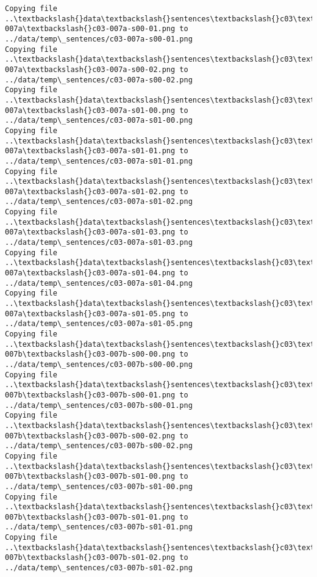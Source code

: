 \documentclass[11pt]{article}
\begin{document}
\begin{Verbatim}[commandchars=\\\{\}]
Copying file ..\textbackslash{}data\textbackslash{}sentences\textbackslash{}c03\textbackslash{}c03-007a\textbackslash{}c03-007a-s00-01.png to
../data/temp\_sentences/c03-007a-s00-01.png
Copying file ..\textbackslash{}data\textbackslash{}sentences\textbackslash{}c03\textbackslash{}c03-007a\textbackslash{}c03-007a-s00-02.png to
../data/temp\_sentences/c03-007a-s00-02.png
Copying file ..\textbackslash{}data\textbackslash{}sentences\textbackslash{}c03\textbackslash{}c03-007a\textbackslash{}c03-007a-s01-00.png to
../data/temp\_sentences/c03-007a-s01-00.png
Copying file ..\textbackslash{}data\textbackslash{}sentences\textbackslash{}c03\textbackslash{}c03-007a\textbackslash{}c03-007a-s01-01.png to
../data/temp\_sentences/c03-007a-s01-01.png
Copying file ..\textbackslash{}data\textbackslash{}sentences\textbackslash{}c03\textbackslash{}c03-007a\textbackslash{}c03-007a-s01-02.png to
../data/temp\_sentences/c03-007a-s01-02.png
Copying file ..\textbackslash{}data\textbackslash{}sentences\textbackslash{}c03\textbackslash{}c03-007a\textbackslash{}c03-007a-s01-03.png to
../data/temp\_sentences/c03-007a-s01-03.png
Copying file ..\textbackslash{}data\textbackslash{}sentences\textbackslash{}c03\textbackslash{}c03-007a\textbackslash{}c03-007a-s01-04.png to
../data/temp\_sentences/c03-007a-s01-04.png
Copying file ..\textbackslash{}data\textbackslash{}sentences\textbackslash{}c03\textbackslash{}c03-007a\textbackslash{}c03-007a-s01-05.png to
../data/temp\_sentences/c03-007a-s01-05.png
Copying file ..\textbackslash{}data\textbackslash{}sentences\textbackslash{}c03\textbackslash{}c03-007b\textbackslash{}c03-007b-s00-00.png to
../data/temp\_sentences/c03-007b-s00-00.png
Copying file ..\textbackslash{}data\textbackslash{}sentences\textbackslash{}c03\textbackslash{}c03-007b\textbackslash{}c03-007b-s00-01.png to
../data/temp\_sentences/c03-007b-s00-01.png
Copying file ..\textbackslash{}data\textbackslash{}sentences\textbackslash{}c03\textbackslash{}c03-007b\textbackslash{}c03-007b-s00-02.png to
../data/temp\_sentences/c03-007b-s00-02.png
Copying file ..\textbackslash{}data\textbackslash{}sentences\textbackslash{}c03\textbackslash{}c03-007b\textbackslash{}c03-007b-s01-00.png to
../data/temp\_sentences/c03-007b-s01-00.png
Copying file ..\textbackslash{}data\textbackslash{}sentences\textbackslash{}c03\textbackslash{}c03-007b\textbackslash{}c03-007b-s01-01.png to
../data/temp\_sentences/c03-007b-s01-01.png
Copying file ..\textbackslash{}data\textbackslash{}sentences\textbackslash{}c03\textbackslash{}c03-007b\textbackslash{}c03-007b-s01-02.png to
../data/temp\_sentences/c03-007b-s01-02.png

\end{Verbatim}
\end{document}
